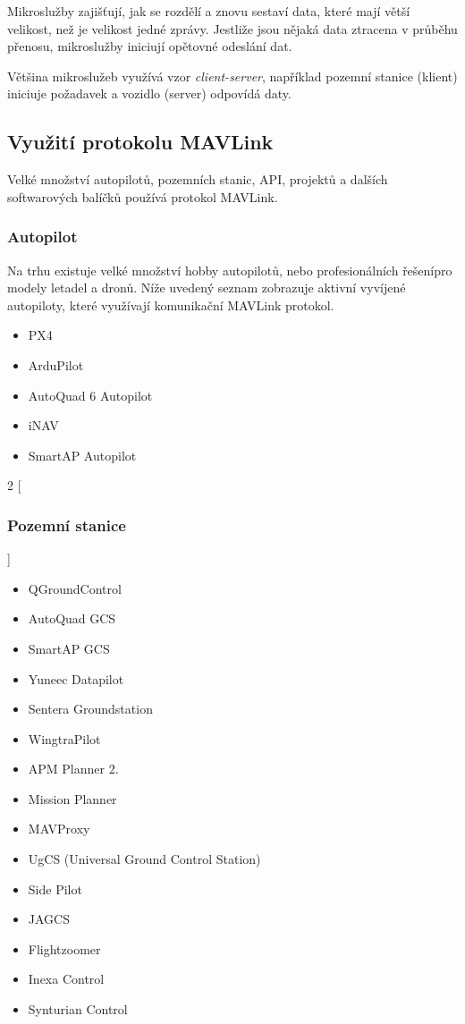 Mikroslužby zajišťují, jak se rozdělí a znovu sestaví data, které mají větší velikost, než je velikost jedné zprávy. Jestliže jsou nějaká data ztracena v průběhu přenosu, mikroslužby iniciují opětovné odeslání dat.

Většina mikroslužeb využívá vzor \textit{client-server}, například pozemní stanice (klient) iniciuje požadavek a vozidlo (server) odpovídá daty.

\subsection{Využití protokolu MAVLink}

Velké množství autopilotů, pozemních stanic, \acs{API}, projektů a dalších softwarových balíčků používá protokol MAVLink.

\subsubsection{Autopilot}

Na trhu existuje velké množství hobby autopilotů, nebo profesionálních řešení\break pro modely letadel a dronů. Níže uvedený seznam zobrazuje aktivní vyvíjené autopiloty, které využívají komunikační MAVLink protokol.  \cite{MAVLINK}

\begin{itemize}
    \item PX4
    \item ArduPilot
    \item AutoQuad 6 Autopilot
    \item iNAV
    \item SmartAP Autopilot\\
\end{itemize}


\begin{multicols}{2}
[
\subsubsection{Pozemní stanice}
]
    \begin{itemize}
        \item QGroundControl
        \item AutoQuad GCS
        \item SmartAP GCS
        \item Yuneec Datapilot
        \item Sentera Groundstation
        \item WingtraPilot
        \item APM Planner 2.
        \item Mission Planner
        \item MAVProxy
        \item UgCS (Universal Ground Control Station)
        \item Side Pilot
        \item JAGCS
        \item Flightzoomer
        \item Inexa Control
        \item Synturian Control
    \end{itemize}
\end{multicols}

